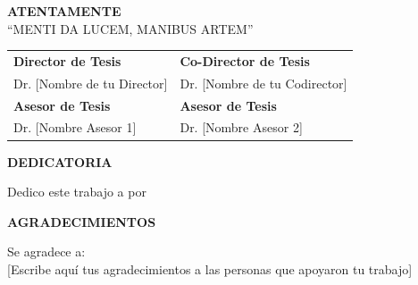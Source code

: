 \documentclass[12pt,letterpaper,oneside]{report}
\newcommand{\miDirector}{Dr. [Nombre de tu Director]}
\newcommand{\miCodirector}{Dr. [Nombre de tu Codirector]}
\newcommand{\miAsesorUno}{Dr. [Nombre Asesor 1]}
\newcommand{\miAsesorDos}{Dr. [Nombre Asesor 2]}
\begin{document}
\begin{center}
{\fontsize{12}{14}\selectfont\bfseries ATENTAMENTE}\\[0.3cm]
{\fontsize{12}{14}\selectfont ``MENTI DA LUCEM, MANIBUS ARTEM''}\\[0.5cm]
\end{center}

\begin{center}
\begin{tabular}{@{}p{6.5cm}p{6.5cm}@{}}
\rule{0pt}{10pt}\textbf{Director de Tesis} & \textbf{Co-Director de Tesis}\\[0.3cm]

\miDirector & \miCodirector\\[0.8cm]

\textbf{Asesor de Tesis} & \textbf{Asesor de Tesis}\\[0.3cm]

\miAsesorUno & \miAsesorDos\\[0.3cm]
\end{tabular}
\end{center}

\newpage
\thispagestyle{empty}

\begin{center}
{\fontsize{14}{16}\selectfont\bfseries DEDICATORIA}\\[1.5cm]
\end{center}

\begin{flushleft}
{\fontsize{12}{14}\selectfont 

Dedico este trabajo a \underline{\hspace{3cm}} por \underline{\hspace{3cm}}\\[2cm]

}
\end{flushleft}

\begin{center}
{\fontsize{14}{16}\selectfont\bfseries AGRADECIMIENTOS}\\[1.5cm]
\end{center}

\begin{flushleft}
{\fontsize{12}{14}\selectfont 

Se agradece a:\\[0.5cm]

[Escribe aquí tus agradecimientos a las personas que apoyaron tu trabajo]

}
\end{flushleft}
\end{document}
